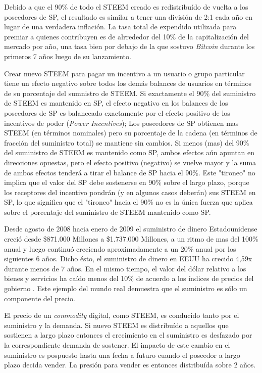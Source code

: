 \documentclass[a4paper,titlepage,final]{article}
\begin{document}
Debido a que el 90\% de todo el STEEM creado es redistribuído de vuelta a los poseedores de SP, el resultado es similar a tener una división de 2:1 cada año en lugar de una verdadera inflación. La tasa total de expendido utilizada para premiar a quienes contribuyen es de alrrededor del 10\% de la capitalización del mercado por año, una tasa bien por debajo de la que sostuvo \textit{Bitcoin} durante los primeros 7 años luego de su lanzamiento.

Crear nuevo STEEM para pagar un incentivo a un usuario o grupo particular tiene un efecto negativo sobre todos los demás balances de usuarios en términos de su porcentaje del sumnistro de STEEM. Si exactamente el 90\% del suministro de STEEM es mantenido en SP, el efecto negativo en los balances de los poseedores de SP es balanceado exactamente por el efecto positivo de los incentivos de poder (\textit{Power Incentives}); Los poseedores de SP obtienen mas STEEM (en términos nominales) pero su porcentaje de la cadena (en términos de fracción del suministro total) se mantiene sin cambios. Si menos (mas) del 90\% del suministro de STEEM es mantenido como SP, ambos efectos aún apuntan en direcciones opuestas, pero el efecto positivo (negativo) se vuelve mayor y la suma de ambos efectos tenderá a tirar el balance de SP hacia el 90\%. Este "tironeo" no implica que el valor del SP debe sostenerse en 90\% sobre el largo plazo, porque los receptores del incentivo pondrán (y en algunos casos deberán) sus STEEM en SP, lo que significa que el "tironeo" hacia el 90\% no es la única fuerza que aplica sobre el porcentaje del suministro de STEEM mantenido como SP.

Desde agosto de 2008 hacia enero de 2009 el suministro de dinero Estadounidense creció desde \$871.000 Millones \cite{17} a \$1.737.000 Millones, a un ritmo de mas del 100\% anual y luego continuó creciendo aproximadamente a un 20\% anual por los siguientes 6 años. Dicho ésto, el suministro de dinero en EEUU ha crecido 4,59x durante menos de 7 años. En el mismo tiempo, el valor del dólar relativo a los bienes y servicios ha caído menos del 10\% de acuerdo a los índices de precios del gobierno \cite{18}. Este ejemplo del mundo real demuestra que el suministro es sólo un componente del precio.

El precio de un \textit{commodity} digital, como STEEM, es conducido tanto por el suministro y la demanda. Si nuevo STEEM es distribuído a aquellos que sostienen a largo plazo entonces el crecimiento en el suministro es desfazado por la correspondiente demanda de sostener. El impacto de este cambio en el suministro es pospuesto hasta una fecha a futuro cuando el poseedor a largo plazo decida vender. La presión para vender es entonces distribuída sobre 2 años.
\end{document}
